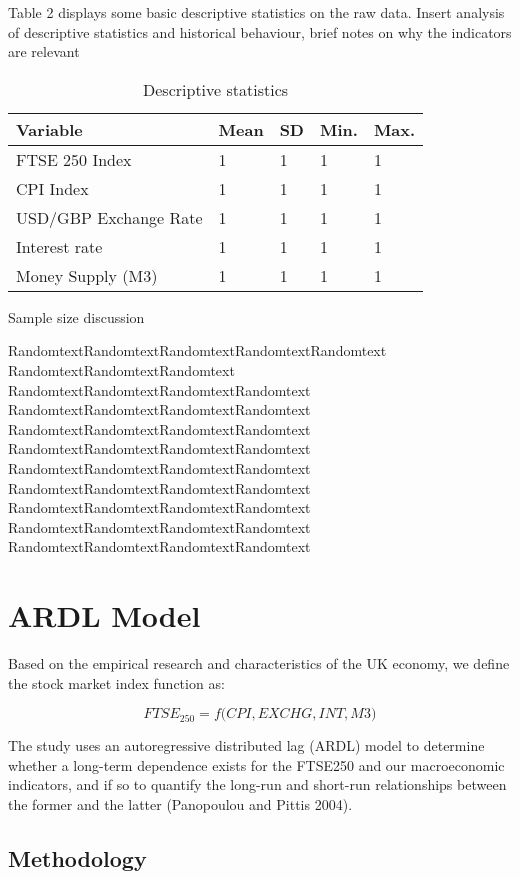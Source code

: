 \documentclass[12pt,a4paper]{article}
\begin{document}
Table 2 displays some basic descriptive statistics on the raw data. 
Insert analysis of descriptive statistics and historical behaviour, 
brief notes on why the indicators are relevant

\begin{table}[h!]
    \centering
    \caption{Descriptive statistics}
    \begin{tabular}{lllll}
        \toprule
        \textbf{Variable} & \textbf{Mean} & \textbf{SD} &  \textbf{Min.} & \textbf{Max.}\\
        \midrule
        FTSE 250 Index &  1 & 1 & 1 & 1 \\
        CPI Index &  1 & 1 & 1 & 1 \\
        USD/GBP Exchange Rate &  1 & 1 & 1 & 1 \\
        Interest rate &  1 & 1 & 1 & 1 \\
        Money Supply (M3) &  1 & 1 & 1 & 1 \\
        \bottomrule
    \end{tabular}
\end{table}

Sample size discussion

RandomtextRandomtextRandomtextRandomtextRandomtext
RandomtextRandomtextRandomtext
RandomtextRandomtextRandomtextRandomtext
RandomtextRandomtextRandomtextRandomtext
RandomtextRandomtextRandomtextRandomtext
RandomtextRandomtextRandomtextRandomtext
RandomtextRandomtextRandomtextRandomtext
RandomtextRandomtextRandomtextRandomtext
RandomtextRandomtextRandomtextRandomtext
RandomtextRandomtextRandomtextRandomtext
RandomtextRandomtextRandomtextRandomtext
\section{ARDL Model}

Based on the empirical research and characteristics of the UK economy, we 
define the stock market index function as:

\begin{equation}
    FTSE_{250} = f\biggl(CPI, EXCHG, INT, M3\biggr)
\end{equation}

The study uses an autoregressive distributed lag (ARDL) model to determine 
whether a long-term dependence exists for the FTSE250 and our macroeconomic 
indicators, and if so to quantify the long-run and short-run relationships
between the former and the latter (Panopoulou and Pittis 2004).

\subsection{Methodology}
\end{document}
